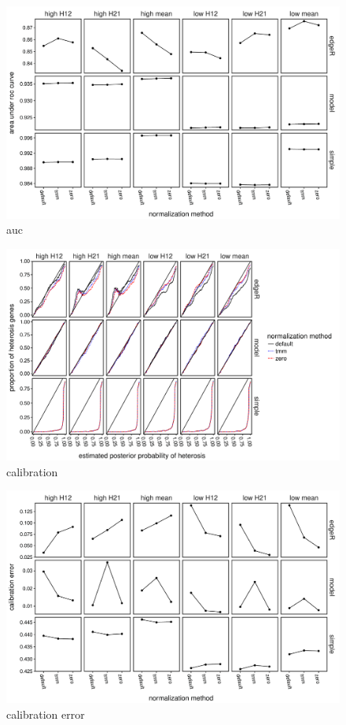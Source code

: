 \documentclass{article}
\begin{document}
\begin{flushleft}
\begin{figure}[htbp]
   \centering
   \includegraphics[scale=0.5]{auc}
   \caption{auc}
   \label{fig:auc}
\end{figure}

\begin{figure}[htbp]
   \centering
   \includegraphics[scale=0.5]{calibration}
   \caption{calibration}
   \label{fig:calibration}
\end{figure}

\begin{figure}[htbp]
   \centering
   \includegraphics[scale=0.5]{calibration_error}
   \caption{calibration error}
   \label{fig:calibrationerror}
\end{figure}


\end{flushleft}
\end{document}
